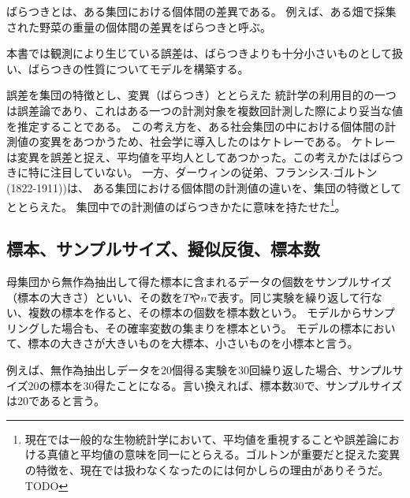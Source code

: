 ばらつきとは、ある集団における個体間の差異である。
例えば、ある畑で採集された野菜の重量の個体間の差異をばらつきと呼ぶ。

本書では観測により生じている誤差は、ばらつきよりも十分小さいものとして扱い、ばらつきの性質についてモデルを構築する。

\begin{SMbox}{誤差を集団の特徴とし、変異（ばらつき）ととらえた}
 統計学の利用目的の一つは誤差論であり、これはある一つの計測対象を複数回計測した際により妥当な値を推定することである。
 この考え方を、ある社会集団の中における個体間の計測値の変異をあつかうため、社会学に導入したのはケトレーである。
 ケトレーは変異を誤差と捉え、平均値を平均人としてあつかった。この考えかたはばらつきに特に注目していない。
 一方、ダーウィンの従弟、フランシス$\cdot$ゴルトン(1822-1911))は、 ある集団における個体間の計測値の違いを、集団の特徴としてととらえた。 集団中での計測値のばらつきかたに意味を持たせた\footnote{現在では一般的な生物統計学において、平均値を重視することや誤差論における真値と平均値の意味を同一にとらえる。ゴルトンが重要だと捉えた変異の特徴を、現在では扱わなくなったのには何かしらの理由がありそうだ。TODO}。

\end{SMbox}

\subsection{標本、サンプルサイズ、擬似反復、標本数}
\begin{defi}
母集団から無作為抽出して得た標本に含まれるデータの個数をサンプルサイズ（標本の大きさ）といい、その数を$T$や$n$で表す。同じ実験を繰り返して行ない、複数の標本を作ると、その標本の個数を標本数という。
モデルからサンプリングした場合も、その確率変数の集まりを標本という。
モデルの標本において、標本の大きさが大きいものを大標本、小さいものを小標本と言う。
\end{defi}
例えば、無作為抽出しデータを$20$個得る実験を30回繰り返した場合、サンプルサイズ$20$の標本を$30$得たことになる。言い換えれば、標本数$30$で、サンプルサイズは$20$であると言う。


